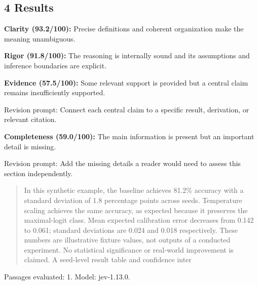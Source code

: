 \documentclass[11pt]{article}
\begin{document}
\subsection{4 Results}
\par\textbf{Clarity (93.2/100):} Precise definitions and coherent organization make the meaning unambiguous.
\par\textbf{Rigor (91.8/100):} The reasoning is internally sound and its assumptions and inference boundaries are explicit.
\par\textbf{Evidence (57.5/100):} Some relevant support is provided but a central claim remains insufficiently supported.
\par Revision prompt: Connect each central claim to a specific result, derivation, or relevant citation.
\par\textbf{Completeness (59.0/100):} The main information is present but an important detail is missing.
\par Revision prompt: Add the missing details a reader would need to assess this section independently.
\begin{quote}\small In this synthetic example, the baseline achieves 81.2\% accuracy with a standard deviation of 1.8
percentage points across seeds. Temperature scaling achieves the same accuracy, as expected
because it preserves the maximal-logit class. Mean expected calibration error decreases from 0.142 to
0.061; standard deviations are 0.024 and 0.018 respectively. These numbers are illustrative fixture
values, not outputs of a conducted experiment. No statistical significance or real-world improvement is
claimed. A seed-level result table and confidence inter\end{quote}
Passages evaluated: 1. Model: jev-1.13.0.
\end{document}
